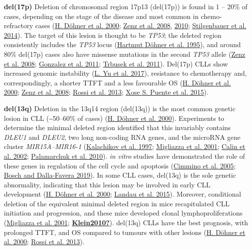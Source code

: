 \documentclass[11pt, a4paper, twosided]{book}
\begin{document}
\textbf{del(17p)}
Deletion of chromosomal region 17p13 (del(17p)) is found in 1 -- 20\% of cases, depending on the stage of the disease and most common in chemo-refractory cases (\protect\hyperlink{ref-Dohner2000}{H. Döhner et al. 2000}; \protect\hyperlink{ref-Zenz2008}{Zenz et al. 2008}, \protect\hyperlink{ref-Zenz2010}{2010}; \protect\hyperlink{ref-Stilgenbauer2014}{Stilgenbauer et al. 2014}). The target of this lesion is thought to be \emph{TP53}; the deleted region consistently includes the \emph{TP53} locus (\protect\hyperlink{ref-Dohner1995}{Hartmut Döhner et al. 1995}), and around 80\% del(17p) cases also have missense mutations in the second \emph{TP53} allele (\protect\hyperlink{ref-Zenz2008}{Zenz et al. 2008}; \protect\hyperlink{ref-Gonzalez2011}{Gonzalez et al. 2011}; \protect\hyperlink{ref-Trbusek2011}{Trbusek et al. 2011}). Del(17p) CLLs show increased genomic instability (\protect\hyperlink{ref-Yu2017}{L. Yu et al. 2017}), resistance to chemotherapy and, correspondingly, a shorter TTFT and a less favourable OS (\protect\hyperlink{ref-Dohner2000}{H. Döhner et al. 2000}; \protect\hyperlink{ref-Zenz2008}{Zenz et al. 2008}; \protect\hyperlink{ref-Rossi2013}{Rossi et al. 2013}; \protect\hyperlink{ref-Puente2015}{Xose S. Puente et al. 2015}).

\textbf{del(13q)}
Deletion in the 13q14 region (del(13q)) is the most common genetic lesion in CLL (\textasciitilde50--60\% of cases) (\protect\hyperlink{ref-Dohner2000}{H. Döhner et al. 2000}). Experiments to determine the minimal deleted region identified that this invariably contains \emph{DLEU1} and \emph{DLEU2}, two long non-coding RNA genes, and the microRNA gene cluster \emph{MIR15A--MIR16-1} (\protect\hyperlink{ref-Kalachikov1997}{Kalachikov et al. 1997}; \protect\hyperlink{ref-Migliazza2001}{Migliazza et al. 2001}; \protect\hyperlink{ref-Calin2002}{Calin et al. 2002}; \protect\hyperlink{ref-Palamarchuk2010}{Palamarchuk et al. 2010}). \emph{in vitro} studies have demonstrated the role of these genes in regulation of the cell cycle and apoptosis (\protect\hyperlink{ref-Cimmino2005}{Cimmino et al. 2005}; \protect\hyperlink{ref-Bosch2019}{Bosch and Dalla-Favera 2019}). In some CLL cases, del(13q) is the sole genetic abnormality, indicating that this lesion may be involved in early CLL development (\protect\hyperlink{ref-Dohner2000}{H. Döhner et al. 2000}; \protect\hyperlink{ref-Landau2015}{Landau et al. 2015}). Moreover, conditional deletion of the equivalent minimal deleted region in mice recapitulated CLL initiation and progression, and these mice developed clonal lymphoproliferations (\protect\hyperlink{ref-Migliazza2001}{Migliazza et al. 2001}; \protect\hyperlink{ref-Klein2010}{\textbf{Klein2010?}}). del(13q) CLLs have the best prognosis, with prolonged TTFT, and OS compared to tumours with other lesions (\protect\hyperlink{ref-Dohner2000}{H. Döhner et al. 2000}; \protect\hyperlink{ref-Rossi2013}{Rossi et al. 2013}).
\end{document}
